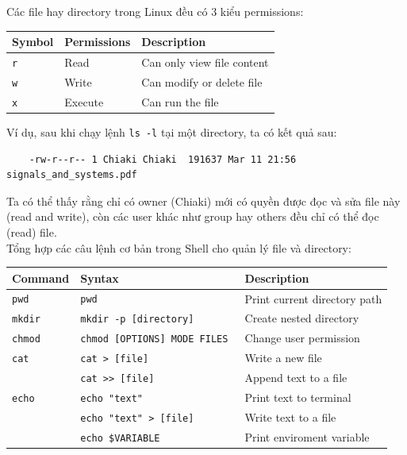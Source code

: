 \documentclass{article}
\begin{document}
Các file hay directory trong Linux đều có 3 kiểu permissions:
\begin{center}
    \begin{tabular}{ | m{5em} | m{5cm}| m{5cm} | } 
      \hline
      Symbol & Permissions & Description \\ 
      \hline
      \verb|r| & Read & Can only view file content \\ 
      \hline
      \verb|w| & Write & Can modify or delete file \\ 
      \hline
      \verb|x|& Execute & Can run the file \\
      \hline
    \end{tabular}
    \end{center}
 Ví dụ, sau khi chạy lệnh \verb|ls -l| tại một directory, ta có kết quả sau:
 \begin{verbatim}
    -rw-r--r-- 1 Chiaki Chiaki  191637 Mar 11 21:56  signals_and_systems.pdf 
 \end{verbatim}
 Ta có thể thấy rằng chỉ có owner (Chiaki) mới có quyền được đọc và sửa file này (read and write), còn các user khác như group hay others đều chỉ có thể đọc (read) file.
 \\ Tổng hợp các câu lệnh cơ bản trong Shell cho quản lý file và directory:
 \begin{center}
    \begin{tabular}{ | m{5em} | m{7cm}| m{7cm} | } 
      \hline
      Command & Syntax & Description \\ 
      \hline
      \verb|pwd| & \verb|pwd| & Print current directory path \\ 
      \hline
      \verb|mkdir| & \verb|mkdir -p [directory]| & Create nested directory \\ 
      \hline
      \verb|chmod|& \verb|chmod [OPTIONS] MODE FILES | & Change user permission \\
      \hline
      \verb|cat| & \verb|cat > [file]| & Write a new file \\  
      
        & \verb|cat >> [file]|  & Append text to a file \\
      \hline
      \verb|echo| & \verb|echo "text"| & Print text to terminal \\  
      
        & \verb|echo "text" > [file]|  & Write text to a file \\
        & \verb|echo $VARIABLE|  & Print enviroment variable \\
      \hline
    \end{tabular}
    \end{center}
\end{document}
